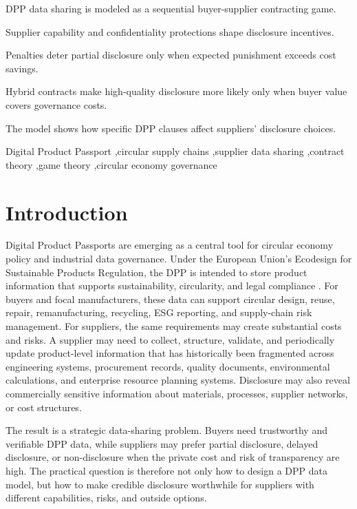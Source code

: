 \documentclass[final,5p,times,authoryear]{elsarticle}
\begin{document}
\begin{frontmatter}
\begin{highlights}
\item DPP data sharing is modeled as a sequential buyer-supplier contracting game.
\item Supplier capability and confidentiality protections shape disclosure incentives.
\item Penalties deter partial disclosure only when expected punishment exceeds cost savings.
\item Hybrid contracts make high-quality disclosure more likely only when buyer value covers governance costs.
\item The model shows how specific DPP clauses affect suppliers' disclosure choices.
\end{highlights}

\begin{keyword}
Digital Product Passport \sep circular supply chains \sep supplier data sharing \sep contract theory \sep game theory \sep circular economy governance
\end{keyword}

\end{frontmatter}

\section{Introduction}

Digital Product Passports are emerging as a central tool for circular economy policy and industrial data governance. Under the European Union's Ecodesign for Sustainable Products Regulation, the DPP is intended to store product information that supports sustainability, circularity, and legal compliance \citep{eu2024espr}. For buyers and focal manufacturers, these data can support circular design, reuse, repair, remanufacturing, recycling, ESG reporting, and supply-chain risk management. For suppliers, the same requirements may create substantial costs and risks. A supplier may need to collect, structure, validate, and periodically update product-level information that has historically been fragmented across engineering systems, procurement records, quality documents, environmental calculations, and enterprise resource planning systems. Disclosure may also reveal commercially sensitive information about materials, processes, supplier networks, or cost structures.

The result is a strategic data-sharing problem. Buyers need trustworthy and verifiable DPP data, while suppliers may prefer partial disclosure, delayed disclosure, or non-disclosure when the private cost and risk of transparency are high. The practical question is therefore not only how to design a DPP data model, but how to make credible disclosure worthwhile for suppliers with different capabilities, risks, and outside options.
\end{document}
